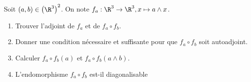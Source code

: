 \begin{enonce}
\begin{exercise}[ID={RMS124 E919 centrale PSI},subtitle={},tags={}, difficulty={0}]
  Soit $(a,b)\in\left( \R^3 \right)^2$.
  On note $f_a : \R^3 \to\R^3, x\mapsto a\wedge x$.
\begin{enumerate}
  \item Trouver l'adjoint de $f_a$ et de $f_a\circ f_b$.
  \item Donner une condition nécessaire et suffisante pour que $f_a\circ f_b$ soit autoadjoint.
  \item Calculer $f_a\circ f_b(a)$ et $f_a\circ f_b\left( a \wedge b \right)$.
  \item L'endomorphisme $f_a\circ f_b$ est-il diagonalisable
\end{enumerate}
\end{exercise}
\begin{solution}
\end{solution}
\end{enonce}
